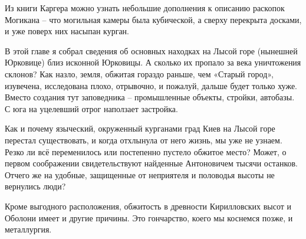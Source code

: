 Из книги Каргера можно узнать небольшие дополнения к описанию раскопок Могикана – что могильная камеры была кубической, а сверху перекрыта досками, и уже поверх них насыпан курган.

В этой главе я собрал сведения об основных находках на Лысой горе (нынешней Юрковице) близ исконной Юрковицы. А сколько их пропало за века уничтожения склонов? Как назло, земля, обжитая гораздо раньше, чем «Старый город», изувечена, исследована плохо, отрывочно, и пожалуй, дальше будет только хуже. Вместо создания тут заповедника – промышленные объекты, стройки, автобазы. С юга на уцелевший отрог наползает застройка.

Как и почему языческий, окруженный курганами град Киев на Лысой горе перестал существовать, и когда отхлынула от него жизнь, мы уже не узнаем. Резко ли всё переменилось или постепенно пустело обжитое место? Может, о первом соображении свидетельствуют найденные Антоновичем тысячи останков. Отчего же на удобные, защищенные от неприятеля и половодья высоты не вернулись люди?

Кроме выгодного расположения, обжитость в древности Кирилловских высот и Оболони имеет и другие причины. Это гончарство, коего мы коснемся позже, и металлургия.
